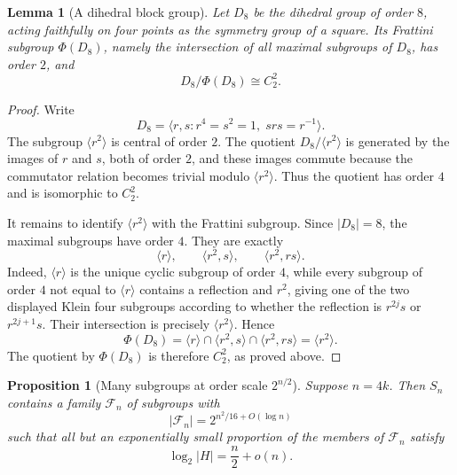 \documentclass[a4paper,11pt]{amsart}
\newtheorem{proposition}[theorem]{Proposition}
\newtheorem{lemma}[theorem]{Lemma}
\theoremstyle{remark}
\begin{document}
\begin{lemma}[A dihedral block group]\label{lem:dihedral-block}
Let \(D_8\) be the dihedral group of order \(8\), acting faithfully on four points as the symmetry
group of a square. Its Frattini subgroup \(\Phi(D_8)\), namely the intersection of all maximal
subgroups of \(D_8\), has order \(2\), and
\[
        D_8/\Phi(D_8)\cong C_2^2.
\]
\end{lemma}

\begin{proof}
Write
\[
        D_8=\langle r,s:r^4=s^2=1,\;srs=r^{-1}\rangle.
\]
The subgroup \(\langle r^2\rangle\) is central of order \(2\). The quotient
\(D_8/\langle r^2\rangle\) is generated by the images of \(r\) and \(s\), both of order \(2\), and
these images commute because the commutator relation becomes trivial modulo \(\langle r^2\rangle\).
Thus the quotient has order \(4\) and is isomorphic to \(C_2^2\).

It remains to identify \(\langle r^2\rangle\) with the Frattini subgroup. Since \(|D_8|=8\), the
maximal subgroups have order \(4\). They are exactly
\[
        \langle r\rangle,
        \qquad
        \langle r^2,s\rangle,
        \qquad
        \langle r^2,rs\rangle.
\]
Indeed, \(\langle r\rangle\) is the unique cyclic subgroup of order \(4\), while every subgroup of
order \(4\) not equal to \(\langle r\rangle\) contains a reflection and \(r^2\), giving one of the
two displayed Klein four subgroups according to whether the reflection is \(r^{2j}s\) or
\(r^{2j+1}s\). Their intersection is precisely \(\langle r^2\rangle\). Hence
\[
        \Phi(D_8)=\langle r\rangle\cap \langle r^2,s\rangle\cap\langle r^2,rs\rangle
        =\langle r^2\rangle.
\]
The quotient by \(\Phi(D_8)\) is therefore \(C_2^2\), as proved above.
\end{proof}

\begin{proposition}[Many subgroups at order scale \(2^{n/2}\)]\label{prop:dihedral-family}
Suppose \(n=4k\). Then \(S_n\) contains a family \(\mathcal F_n\) of subgroups with
\[
        |\mathcal F_n|=2^{n^2/16+O(\log n)}
\]
such that all but an exponentially small proportion of the members of \(\mathcal F_n\) satisfy
\[
        \log_2 |H|=\frac n2+o(n).
\]
\end{proposition}
\end{document}
